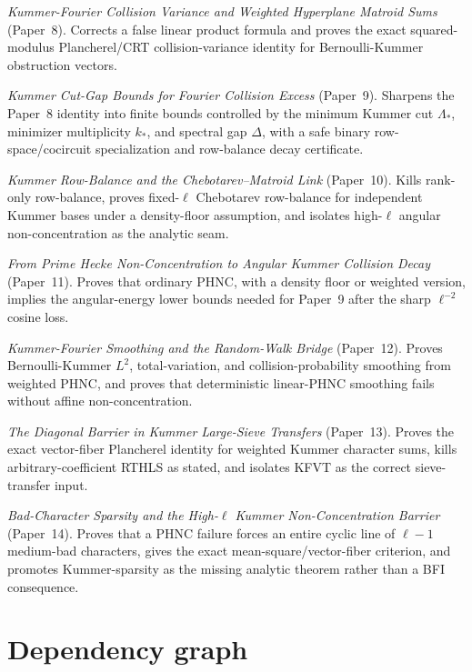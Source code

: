 \documentclass[11pt]{article}
\newcommand{\1}{\mathbf 1}
\begin{document}
\begin{enumerate}[leftmargin=2.5em,label=\textbf{[\arabic*]}]
\item \emph{Kummer-Fourier Collision Variance and Weighted Hyperplane Matroid Sums} (Paper~8).  Corrects a false linear product formula and proves the exact squared-modulus Plancherel/CRT collision-variance identity for Bernoulli-Kummer obstruction vectors.
\item \emph{Kummer Cut-Gap Bounds for Fourier Collision Excess} (Paper~9).  Sharpens the Paper~8 identity into finite bounds controlled by the minimum Kummer cut \(\Lambda_*\), minimizer multiplicity \(k_*\), and spectral gap \(\Delta\), with a safe binary row-space/cocircuit specialization and row-balance decay certificate.
\item \emph{Kummer Row-Balance and the Chebotarev--Matroid Link} (Paper~10).  Kills rank-only row-balance, proves fixed-\(\ell\) Chebotarev row-balance for independent Kummer bases under a density-floor assumption, and isolates high-\(\ell\) angular non-concentration as the analytic seam.
\item \emph{From Prime Hecke Non-Concentration to Angular Kummer Collision Decay} (Paper~11).  Proves that ordinary PHNC, with a density floor or weighted version, implies the angular-energy lower bounds needed for Paper~9 after the sharp \(\ell^{-2}\) cosine loss.
\item \emph{Kummer-Fourier Smoothing and the Random-Walk Bridge} (Paper~12).  Proves Bernoulli-Kummer \(L^2\), total-variation, and collision-probability smoothing from weighted PHNC, and proves that deterministic linear-PHNC smoothing fails without affine non-concentration.
\item \emph{The Diagonal Barrier in Kummer Large-Sieve Transfers} (Paper~13).  Proves the exact vector-fiber Plancherel identity for weighted Kummer character sums, kills arbitrary-coefficient RTHLS as stated, and isolates KFVT as the correct sieve-transfer input.
\item \emph{Bad-Character Sparsity and the High-\(\ell\) Kummer Non-Concentration Barrier} (Paper~14).  Proves that a PHNC failure forces an entire cyclic line of \(\ell-1\) medium-bad characters, gives the exact mean-square/vector-fiber criterion, and promotes Kummer-sparsity as the missing analytic theorem rather than a BFI consequence.
\end{enumerate}

\section{Dependency graph}
\end{document}
